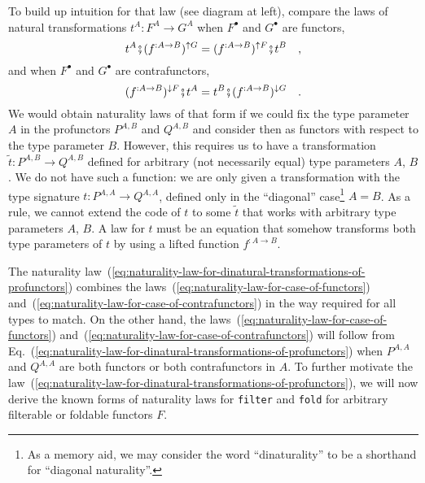 To build up intuition for that law (see diagram at left), compare
the laws of natural transformations $t^{A}:F^{A}\rightarrow G^{A}$
when $F^{\bullet}$ and $G^{\bullet}$ are functors,
\begin{equation}
t^{A}\bef(f^{:A\rightarrow B})^{\uparrow G}=(f^{:A\rightarrow B})^{\uparrow F}\bef t^{B}\quad,\label{eq:naturality-law-for-case-of-functors}
\end{equation}
and when $F^{\bullet}$ and $G^{\bullet}$ are contrafunctors,
\begin{equation}
(f^{:A\rightarrow B})^{\downarrow F}\bef t^{A}=t^{B}\bef(f^{:A\rightarrow B})^{\downarrow G}\quad.\label{eq:naturality-law-for-case-of-contrafunctors}
\end{equation}
We would obtain naturality laws of that form if we could fix the type
parameter $A$ in the profunctors $P^{A,B}$ and $Q^{A,B}$ and consider
then as functors with respect to the type parameter $B$. However,
this requires us to have a transformation $\tilde{t}:P^{A,B}\rightarrow Q^{A,B}$
defined for arbitrary (not necessarily equal) type parameters $A$,
$B$. We do not have such a function: we are only given a transformation
with the type signature $t:P^{A,A}\rightarrow Q^{A,A}$, defined only
in the \textsf{``}diagonal\textsf{''} case\footnote{As a memory aid, we may consider the word \textsf{``}dinaturality\textsf{''} to be
a shorthand for \textsf{``}diagonal naturality\textsf{''}.} $A=B$. As a rule, we cannot extend the code of $t$ to some $\tilde{t}$
that works with arbitrary type parameters $A$, $B$. A law for $t$
must be an equation that somehow transforms both type parameters of
$t$ by using a lifted function $f^{:A\rightarrow B}$. 

The naturality law~(\ref{eq:naturality-law-for-dinatural-transformations-of-profunctors})
combines the laws~(\ref{eq:naturality-law-for-case-of-functors})
and~(\ref{eq:naturality-law-for-case-of-contrafunctors}) in the
way required for all types to match. On the other hand, the laws~(\ref{eq:naturality-law-for-case-of-functors})
and~(\ref{eq:naturality-law-for-case-of-contrafunctors}) will follow
from Eq.~(\ref{eq:naturality-law-for-dinatural-transformations-of-profunctors})
when $P^{A,A}$ and $Q^{A,A}$ are both functors or both contrafunctors
in $A$. To further motivate the law~(\ref{eq:naturality-law-for-dinatural-transformations-of-profunctors}),
we will now derive the known forms of naturality laws for \lstinline!filter!
and \lstinline!fold! for arbitrary filterable or foldable functors
$F$.

